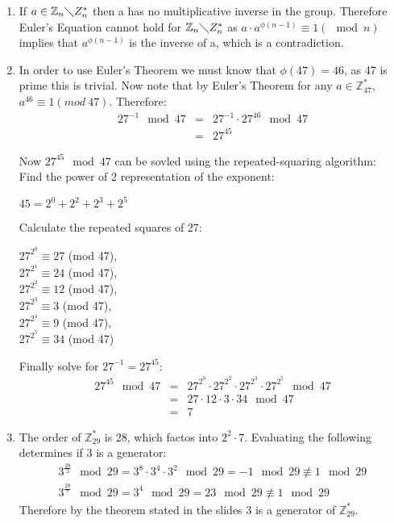\begin{enumerate}
    \item If $a \in \mathbb{Z}_{n}\mathbb\diagdown{Z}^{*}_{n}$ then a has no multiplicative inverse in the group. Therefore Euler's Equation cannot hold for $\mathbb{Z}_{n}\mathbb\diagdown{Z}^{*}_{n}$ as $a \cdot a^{\phi(n-1)} \equiv 1 (\mod n)$ implies that $a^{\phi(n-1)}$ is the inverse of a, which is a contradiction.

    \item In order to use Euler's Theorem we must know that $\phi(47) = 46$, as 
    47 is prime this is trivial. Now note that by Euler's Theorem for any $a \in
     \mathbb{Z}^{*}_{47}$,\\ $a^{46} \equiv 1 (mod\ 47)$. Therefore:
    \begin{eqnarray*}
        27^{-1} \mod 47 &=& 27^{-1} \cdot 27^{46} \mod 47 \\
        &=& 27^{45}
    \end{eqnarray*}

    Now $27^{45} \mod 47$ can be sovled using the repeated-squaring algorithm: \\
    Find the power of 2 representation of the exponent:
    \begin{center}
        $45 = 2^{0} + 2^{2} + 2^{3} + 2^{5}$
    \end{center}

    Calculate the repeated squares of 27:
    \begin{center}
        $27^{2^{0}} \equiv 27$ (mod 47), \\
        $27^{2^{1}} \equiv 24$ (mod 47), \\
        $27^{2^{2}} \equiv 12$ (mod 47), \\
        $27^{2^{3}} \equiv 3$ (mod 47), \\
        $27^{2^{4}} \equiv 9$ (mod 47), \\
        $27^{2^{5}} \equiv 34$ (mod 47)
    \end{center}

    Finally solve for $27^{-1} = 27^{45}$:
    \begin{eqnarray*}
        27^{45} \mod 47 &=& 27^{2^{0}} \cdot 27^{2^{2}} \cdot 27^{2^{3}} \cdot 27^{2^{5}} \mod 47 \\
        &=& 27 \cdot 12 \cdot 3 \cdot 34 \mod 47 \\
        &=& 7
    \end{eqnarray*}

    \item The order of $\mathbb{Z}^{*}_{29}$ is 28, which factos into $2^{2} \cdot 7$. Evaluating the following determines if 3 is a generator:
    \begin{eqnarray*}
        3^{\frac{28}{2}} \mod 29 = 3^{8} \cdot 3^{4} \cdot 3^{2} \mod 29 = -1 \mod 29 \not\equiv 1 \mod 29 \\
        3^{\frac{28}{7}} \mod 29 = 3^{4} \mod 29 = 23 \mod 29 \not\equiv 1 \mod 29
    \end{eqnarray*}
    Therefore by the theorem stated in the slides\cite{Slides_70} 3 is a generator of $\mathbb{Z}^{*}_{29}$.

\end{enumerate}